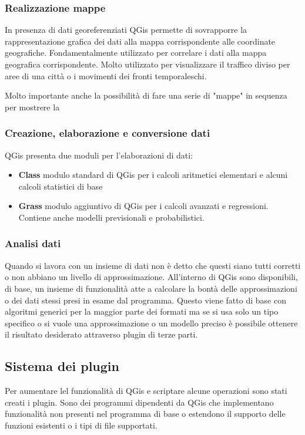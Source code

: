 \subsubsection{Realizzazione mappe}
In presenza di dati georeferenziati QGis permette di sovrapporre la rappresentazione grafica dei dati alla mappa corrispondente alle coordinate geografiche.
Fondamentalmente utilizzato per correlare i dati alla mappa geografica corrispondente. Molto utilizzato per visualizzare il traffico diviso per aree di una città o i movimenti dei fronti temporaleschi. 

Molto importante anche la possibilità di fare una serie di "mappe" in sequenza per mostrere la  

\subsubsection{Creazione, elaborazione e conversione dati}
QGis presenta due moduli per l'elaborazioni di dati:
\begin{itemize}
	\item \textbf{Class} modulo standard di QGis per i calcoli aritmetici elementari e alcuni calcoli statistici di base
	\item \textbf{Grass} modulo aggiuntivo di QGis per i calcoli avanzati e regressioni. Contiene anche modelli previsionali e probabilistici.
\end{itemize}

\subsubsection{Analisi dati}
Quando si lavora con un insieme di dati non è detto che questi siano tutti corretti o non abbiano un livello di approssimazione.
All'interno di QGis sono disponibili, di base, un insieme di funzionalità atte a calcolare la bontà delle approssimazioni o dei dati stessi presi in esame dal programma.
Questo viene fatto di base con algoritmi generici per la maggior parte dei formati ma se si usa solo un tipo specifico o si vuole una approssimazione o un modello preciso è possibile ottenere il risultato desiderato attraverso plugin di terze parti.

\subsection{Sistema dei plugin}
Per aumentare lel funzionalità di QGis e scriptare alcune operazioni sono stati creati i plugin.
Sono dei programmi dipendenti da QGis che implementano funzionalità non presenti nel programma di base o estendono il supporto delle funzioni esistenti o i tipi di file supportati.

